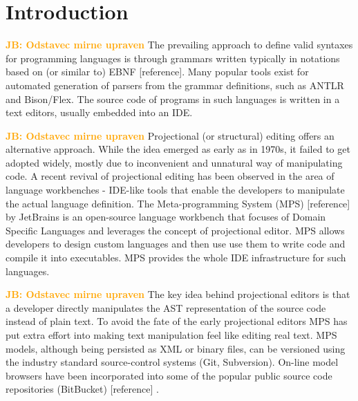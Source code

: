 \documentclass[10pt]{sigplanconf}
\newcommand{\JB}[1]{\textcolor{orange}{\bfseries JB: #1}} %
\begin{document}
\section{Introduction}

\JB{Odstavec mirne upraven} The prevailing approach to define valid syntaxes for programming languages is through grammars written typically in notations based on (or similar to) EBNF [reference]. Many popular tools exist for automated generation of parsers from the grammar definitions, such as ANTLR and Bison/Flex. The source code of programs in such languages is written in a text editors, usually embedded into an IDE.

\JB{Odstavec mirne upraven} Projectional (or structural) editing offers an alternative approach. While the idea emerged as early as in 1970s, it failed to get adopted widely, mostly due to inconvenient and unnatural way of manipulating code.  A recent revival of projectional editing has been observed in the area of language workbenches - IDE-like tools that enable the developers to manipulate the actual language definition. The Meta-programming System (MPS) [reference] by JetBrains is an open-source language workbench that focuses of Domain Specific Languages and leverages the concept of projectional editor. MPS allows developers to design custom languages and then use use them to write code and compile it into executables. MPS provides the whole IDE infrastructure for such languages.

\JB{Odstavec mirne upraven} The key idea behind projectional editors is that a developer directly manipulates the AST representation of the source code instead of plain text. To avoid the fate of the early projectional editors MPS has put extra effort into making text manipulation feel like editing real text. MPS models, although being persisted as XML or binary files, can be versioned using the industry standard source-control systems (Git, Subversion). On-line model browsers have been incorporated into some of the popular public source code repositories (BitBucket) [reference] .
\end{document}
